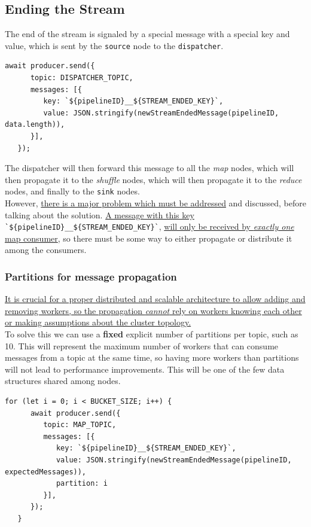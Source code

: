\subsection{Ending the Stream}
The end of the stream is signaled by a special message with a special key and value, which is sent by the \texttt{source} node to the \texttt{dispatcher}.
\begin{lstlisting}[label={lst:streamEndedSource},caption={Sending STREAM\_ENDED message from source to dispatcher},captionpos={top}]
   await producer.send({
      topic: DISPATCHER_TOPIC,
      messages: [{
         key: `${pipelineID}__${STREAM_ENDED_KEY}`,
         value: JSON.stringify(newStreamEndedMessage(pipelineID, data.length)),
      }],
   });
\end{lstlisting}
 
The dispatcher will then forward this message to all the \textit{map} nodes, which will then propagate it to the \textit{shuffle} nodes, which will then propagate it to the \textit{reduce} nodes, and finally to the \texttt{sink} nodes.\\
However, \ul{there is a major problem which must be addressed} and discussed, before talking about the solution. \ul{A message with this key} \verb|`${pipelineID}__${STREAM_ENDED_KEY}`|, \ul{will only be received by \textit{exactly one} map consumer}, so there must be some way to either propagate or distribute it among the consumers.

\subsubsection{Partitions for message propagation}
\ul{It is crucial for a proper distributed and scalable architecture to allow adding and removing workers, so the propagation \textit{cannot} rely on workers knowing each other or making assumptions about the cluster topology.}\\
To solve this we can use a \textbf{fixed} explicit number of partitions per topic, such as 10. This will represent the maximum number of workers that can consume messages from a topic at the same time, so having more workers than partitions will not lead to performance improvements.
This will be one of the few data structures shared among nodes.

\begin{lstlisting}[label={lst:bucketsize},caption={BUCKET\_SIZE represents the number of partitions per topic.},captionpos={top}]
for (let i = 0; i < BUCKET_SIZE; i++) {
      await producer.send({
         topic: MAP_TOPIC,
         messages: [{
            key: `${pipelineID}__${STREAM_ENDED_KEY}`,
            value: JSON.stringify(newStreamEndedMessage(pipelineID, expectedMessages)),
            partition: i
         }],
      });
   }
\end{lstlisting}

